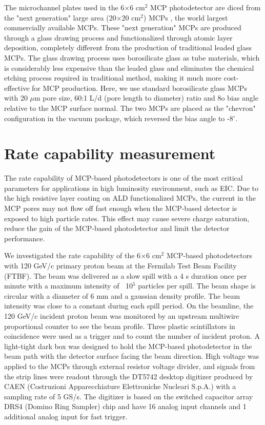 \documentclass[preprint,5p]{elsarticle}
\begin{document}
The microchannel plates used in the 6$\times$6 cm$^2$ MCP photodetector are diced from the "next generation" large area (20$\times$20 cm$^2$) MCPs \cite{LAPPD,Craven-MCPs}, the world largest commercially available MCPs. These "next generation" MCPs are produced through a glass drawing process and functionalized through atomic layer deposition, completely different from the production of traditional leaded glass MCPs. The glass drawing process uses borosilicate glass as tube materials, which is considerably less expensive than the leaded glass and eliminates the chemical etching process required in traditional method, making it much more cost-effective for MCP production. Here, we use standard borosilicate glass MCPs with 20 $\mu$m pore size, 60:1 L/d (pore length to diameter) ratio and 8o bias angle relative to the MCP surface normal. The two MCPs are placed as the "chevron" configuration in the vacuum package, which reversed the bias angle to -8$^{\circ}$. 


\section{Rate capability measurement} \label{sec_proton_measurements}
The rate capability of MCP-based photodetectors is one of the most critical parameters for applications in high luminosity environment, such as EIC. Due to the high resistive layer coating on ALD functionalized MCPs, the current in the MCP pores may not flow off fast enough when the MCP-based detector is exposed to high particle rates. This effect may cause severe charge saturation, reduce the gain of the MCP-based photodetector and limit the detector performance. 
 
We investigated the rate capability of the 6$\times$6 cm$^2$ MCP-based photodetectors with 120 GeV/c primary proton beam at the Fermilab Test Beam Facility (FTBF). The beam was delivered as a slow spill with a 4 s duration once per minute with a maximum intensity of $~$ 10$^5$ particles per spill. The beam shape is circular with a diameter of 6 mm and a gaussian density profile. The beam intensity was close to a constant during each spill period. On the beamline, the 120 GeV/c incident proton beam was monitored by an upstream multiwire proportional counter to see the beam profile. Three plastic scintillators in coincidence were used as a trigger and to count the number of incident proton. A light-tight dark box was designed to hold the MCP-based photodetector in the beam path with the detector surface facing the beam direction. High voltage was applied to the MCPs through external resistor voltage divider, and signals from the strip lines were readout through the DT5742 desktop digitizer \cite{Digitizer} produced by CAEN (Costruzioni Apparecchiature Elettroniche Nucleari S.p.A.) with a sampling rate of 5 GS/s. The digitizer is based on the switched capacitor array DRS4 (Domino Ring Sampler) chip \cite{DRS} and have 16 analog input channels and 1 additional analog input for fast trigger.
\end{document}
